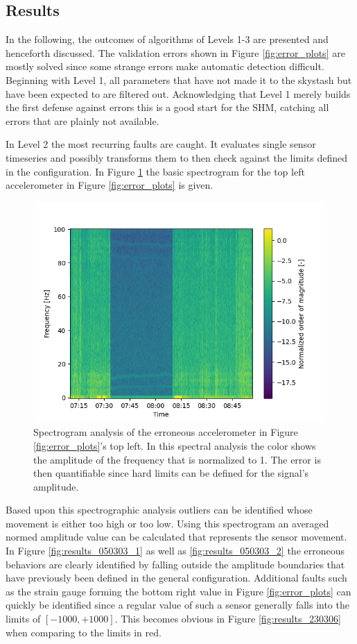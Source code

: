 \subsection{Results}


In the following, the outcomes of algorithms of Levels 1-3 are presented and henceforth discussed.
The validation errors shown in Figure \ref{fig:error_plots} are mostly solved since some strange errors make automatic detection difficult.
Beginning with Level 1, all  parameters that have not made it to the skystash but have been expected to are filtered out. Acknowledging that Level 1 merely builds the first defense against errors this is a good start for the SHM, catching all errors that are plainly not available.

In Level 2 the most recurring faults are caught. It evaluates single sensor timeseries and possibly transforms them to then check against the limits defined in the configuration. In Figure \ref{fig:results_050303_spectrogram} the basic spectrogram for the top left accelerometer in Figure \ref{fig:error_plots} is given.

\begin{figure}
    \centering
    \includegraphics[width=.7\textwidth]{03_figures/python_functions/images/FUS_050303_spectro.png}
    \caption[Level 2 spectral analysis of an erroneous accelerometer]{Spectrogram analysis of the erroneous accelerometer in Figure \ref{fig:error_plots}'s top left. In this spectral analysis the color shows the amplitude of the frequency that is normalized to 1. The error is then quantifiable since hard limits can be defined for the signal's amplitude.}
    \label{fig:results_050303_spectrogram}
\end{figure}

Based upon this spectrographic analysis outliers can be identified whose movement is either too high or too low. Using this spectrogram an averaged normed amplitude value can be calculated that represents the sensor movement. In Figure \ref{fig:results_050303_1} as well as \ref{fig:results_050303_2} the erroneous behaviors are clearly identified by falling outside the amplitude boundaries that have previously been defined in the general configuration.
Additional faults such as the strain gauge forming the bottom right value in Figure \ref{fig:error_plots} can quickly be identified since a regular value of such a sensor generally falls into the limits of $[-1000, +1000]$. This becomes obvious in Figure \ref{fig:results_230306} when comparing to the limits in red.


